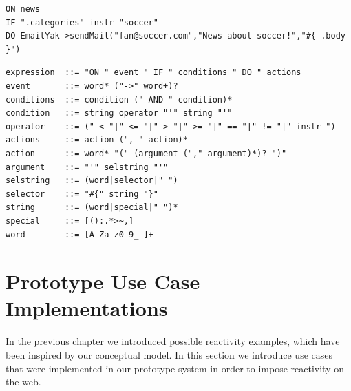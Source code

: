 \begin{lstlisting}[float=h,language=OwnRule,label={lst:exampleRulePhrase},caption=Example Phrase in Prototype Rule Language]
ON news
IF ".categories" instr "soccer"
DO EmailYak->sendMail("fan@soccer.com","News about soccer!","#{ .body }")
\end{lstlisting}

\begin{lstlisting}[float=h,language=OwnRule,label={lst:backusnaur},caption={Extended Backus-Naur Form of Prototype Rule Language Syntax}]
expression  ::= "ON " event " IF " conditions " DO " actions
event       ::= word* ("->" word+)?
conditions  ::= condition (" AND " condition)*
condition   ::= string operator "'" string "'"
operator    ::= (" < "|" <= "|" > "|" >= "|" == "|" != "|" instr ")
actions     ::= action (", " action)*
action      ::= word* "(" (argument ("," argument)*)? ")"
argument    ::= "'" selstring "'"
selstring   ::= (word|selector|" ")
selector    ::= "#{" string "}"
string      ::= (word|special|" ")*
special     ::= [():.*>~,]
word        ::= [A-Za-z0-9_-]+
\end{lstlisting}



\section{Prototype Use Case Implementations}
In the previous chapter we introduced possible reactivity examples, which have been inspired by our conceptual model.
In this section we introduce use cases that were implemented in our prototype system in order to impose reactivity on the \textrm{\gls{web}}.


